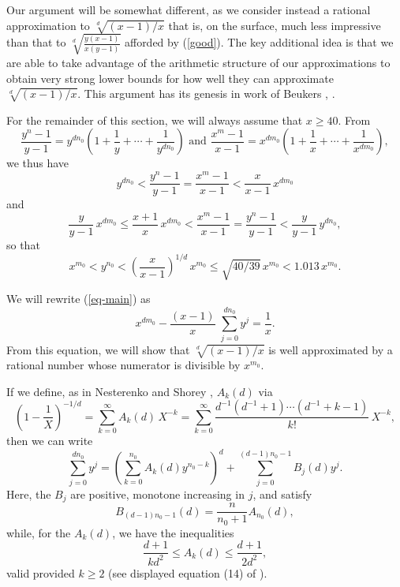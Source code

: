 Our argument will be somewhat different, as we consider instead a rational approximation to 
$\sqrt[d]{(x-1)/x}$ that is, on the surface, much less impressive than that to $\sqrt[d]{\frac{y(x-1)}{x(y-1)}}$ afforded by (\ref{good}). The key additional idea is that we are able to take advantage of the arithmetic structure of our approximations  to obtain very strong lower bounds for how well they can approximate $\sqrt[d]{(x-1)/x}$. This argument has its genesis in work of Beukers \cite{Beu1}, \cite{Beu2}.

For the remainder of this section, we will always assume that $x \geq 40$. From
 $$
 \frac{y^n-1}{y-1} = y^{dn_0} \left( 1 + \frac{1}{y} +  \cdots + \frac{1}{y^{dn_0}} \right) \mbox{ and }  \frac{x^m-1}{x-1} = x^{dm_0} \left( 1 + \frac{1}{x} + \cdots + \frac{1}{x^{dm_0}} \right) ,
 $$
 we thus have
 $$
y^{dn_0}  <  \frac{y^n-1}{y-1} =  \frac{x^m-1}{x-1}  < \frac{x}{x-1} \,   x^{dm_0}
$$
and
$$
\frac{y}{y-1} \, x^{dm_0} \leq \frac{x+1}{x}  \, x^{dm_0} <  \frac{x^m-1}{x-1}  =  \frac{y^n-1}{y-1} 
< \frac{y}{y-1} \, y^{dn_0},
$$
so that 
\begin{equation} \label{goop}
x^{m_0} < y^{n_0} <\left( \frac{x}{x-1} \right)^{1/d} \, x^{m_0} \leq \sqrt{40/39} \, x^{m_0} < 1.013 \, x^{m_0}.
\end{equation}


We will rewrite  (\ref{eq-main})
 as 
 $$
 x^{d m_0} -  \frac{(x-1)}{x} \;   \sum_{j=0}^{dn_0} y^j = \frac{1}{x}.
 $$
 From this equation, we will show that $\sqrt[d]{(x-1)/x}$ is well approximated by a rational number whose numerator is divisible by $x^{m_0}$.
 
If we define, as in Nesterenko and Shorey \cite{NeSh},  $A_k (d)$ via
 $$
  \left( 1 - \frac{1}{X} \right)^{-1/d} = \sum_{k=0}^\infty A_k (d) \, X^{-k} = \sum_{k=0}^\infty
  \frac{d^{-1} ( d^{-1}+1) \cdots (d^{-1} + k-1)}{k!} \, X^{-k},
 $$
 then we can write 
 $$
 \sum_{j=0}^{dn_0} y^j = \left( \sum_{k = 0}^{n_0} A_k (d) y^{n_0-k} \right)^d + \sum_{j=0}^{(d-1)n_0-1} B_j(d) y^j.
 $$
Here, the $B_j$ are positive, monotone increasing in $j$, and satisfy
 $$
 B_{(d-1)n_0-1} (d) = \frac{n}{n_0+1} A_{n_0} (d),
 $$
 while, for the $A_k(d)$, we have the inequalities
 $$
 \frac{d+1}{k d^2} \leq A_k (d) \leq  \frac{d+1}{2 d^2},
 $$
valid  provided $k \geq 2$ (see displayed equation (14) of \cite{NeSh}). 
 
